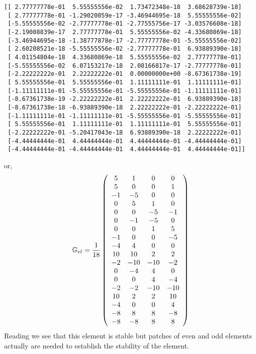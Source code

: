 \begin{verbatim}
[[ 2.77777778e-01  5.55555556e-02  1.73472348e-18  3.68628739e-18]
 [ 2.77777778e-01 -1.29020059e-17 -3.46944695e-18  5.55555556e-02]
 [-5.55555556e-02 -2.77777778e-01 -2.77555756e-17 -3.03576608e-18]
 [-2.19008839e-17  2.77777778e-01  5.55555556e-02 -4.33680869e-18]
 [-3.46944695e-18 -1.38777878e-17 -2.77777778e-01 -5.55555556e-02]
 [ 2.60208521e-18 -5.55555556e-02 -2.77777778e-01  6.93889390e-18]
 [ 4.01154804e-18  4.33680869e-18  5.55555556e-02  2.77777778e-01]
 [-5.55555556e-02  6.07153217e-18  2.08166817e-17 -2.77777778e-01]
 [-2.22222222e-01  2.22222222e-01  0.00000000e+00 -8.67361738e-19]
 [ 5.55555556e-01  5.55555556e-01  1.11111111e-01  1.11111111e-01]
 [-1.11111111e-01 -5.55555556e-01 -5.55555556e-01 -1.11111111e-01]
 [-8.67361738e-19 -2.22222222e-01  2.22222222e-01  6.93889390e-18]
 [-8.67361738e-18 -6.93889390e-18  2.22222222e-01 -2.22222222e-01]
 [-1.11111111e-01 -1.11111111e-01 -5.55555556e-01 -5.55555556e-01]
 [ 5.55555556e-01  1.11111111e-01  1.11111111e-01  5.55555556e-01]
 [-2.22222222e-01 -5.20417043e-18  6.93889390e-18  2.22222222e-01]
 [-4.44444444e-01  4.44444444e-01  4.44444444e-01 -4.44444444e-01]
 [-4.44444444e-01 -4.44444444e-01  4.44444444e-01  4.44444444e-01]]
\end{verbatim}
or,
\[
{\mathbb{G}}_{el} 
=\frac{1}{18}
\left(
\begin{array}{cccc}
5 &1 &0 &0 \\
5 &0 &0 &1 \\
-1 &-5 &0 &0\\ 
0 &5 &1 &0\\
0 &0 &-5 &-1 \\
0 &-1 &-5 &0 \\
0 &0& 1& 5\\
-1 &0 &0& -5\\
-4 &4 &0 &0\\
10 &10& 2 &2\\
-2 &-10 &-10 &-2\\
0 &-4 &4& 0\\
0 &0 &4 &-4\\
-2 &-2& -10 &-10\\
10 &2 &2 &10\\
-4 &0 &0 &4\\
-8 &8 &8 &-8 \\
-8 &-8 &8 &8
\end{array}
\right)
\]
Reading \textcite{elsw} we see that this element is stable but patches of
even and odd elements actually are needed to establish the stability of the element.










